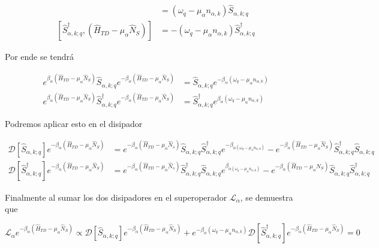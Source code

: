 \begin{appendixs}
\begin{align*}
    [\hat{S}_{\alpha,k;q},(\hat{H}_{TD} - \mu_{\alpha}\hat{N}_{S})] & = (\omega_{q} - \mu_{\alpha}n_{\alpha,k})\hat{S}_{\alpha,k;q}  \\
    [\hat{S}^{\dagger}_{\alpha,k;q},(\hat{H}_{TD} - \mu_{\alpha}\hat{N}_{S})] & = -(\omega_{q} - \mu_{\alpha}n_{\alpha,k})\hat{S}^{\dagger}_{\alpha,k;q}
\end{align*}

 Por ende se tendrá

 \begin{align*}
    e^{\beta_{\alpha}(\hat{H}_{TD} - \mu_{\alpha}\hat{N}_{S})}\hat{S}_{\alpha,k;q} e^{-\beta_{\alpha}(\hat{H}_{TD} - \mu_{\alpha}\hat{N}_{S})} & = \hat{S}_{\alpha,k;q}e^{-\beta_{\alpha}(\omega_{q} - \mu_{\alpha}n_{\alpha,k})} \\
    e^{\beta_{\alpha}(\hat{H}_{TD} - \mu_{\alpha}\hat{N}_{S})}\hat{S}^{\dagger}_{\alpha,k;q} e^{-\beta_{\alpha}(\hat{H}_{TD} - \mu_{\alpha}\hat{N}_{S})} & = \hat{S}^{\dagger}_{\alpha,k;q}e^{\beta_{\alpha}(\omega_{q} - \mu_{\alpha}n_{\alpha,k})}
 \end{align*}

Podremos aplicar esto en el disipador

\begin{align*}
    \mathcal{D}[\hat{S}_{\alpha,k;q}]e^{-\beta_{\alpha}(\hat{H}_{TD} - \mu_{\alpha}\hat{N}_{S})} & =  e^{-\beta_{\alpha}(\hat{H}_{TD} - \mu_{\alpha}\hat{N}_{s})} \hat{S}_{\alpha,k;q}\hat{S}^{\dagger}_{\alpha,k;q} e^{-\beta_{\alpha(\omega_{q} - \mu_{\alpha}n_{\alpha,k})}} - e^{-\beta_{\alpha}(\hat{H}_{TD} - \mu_{\alpha}\hat{N}_{S})} \hat{S}^{\dagger}_{\alpha,k;q}\hat{S}_{\alpha,k;q} \\
    \mathcal{D}[\hat{S}^{\dagger}_{\alpha,k;q}]e^{-\beta_{\alpha}(\hat{H}_{TD} - \mu_{\alpha}\hat{N}_{S})} & = e^{-\beta_{\alpha}(\hat{H}_{TD} - \mu_{\alpha}\hat{N}_{s})} \hat{S}^{\dagger}_{\alpha,k;q}\hat{S}_{\alpha,k;q} e^{\beta_{\alpha(\omega_{q} - \mu_{\alpha}n_{\alpha,k})}} - e^{-\beta_{\alpha}(\hat{H}_{TD} - \mu_{\alpha}\hat{N}_{S})} \hat{S}_{\alpha,k;q}\hat{S}^{\dagger}_{\alpha,k;q} 
\end{align*}

Finalmente al sumar los dos disipadores en el superoperador $\mathcal{L}_{\alpha}$, se demuestra que

\begin{equation*}
    \mathcal{L}_{\alpha}e^{-\beta_{\alpha}(\hat{H}_{TD} - \mu_{\alpha}\hat{N}_{S})} \propto  \mathcal{D}[\hat{S}_{\alpha,k;q}]e^{-\beta_{\alpha}(\hat{H}_{TD} - \mu_{\alpha}\hat{N}_{S})} + e^{-\beta_{\alpha}(\omega_{q} - \mu_{\alpha}n_{\alpha,k})}\mathcal{D}[\hat{S}^{\dagger}_{\alpha,k;q}]e^{-\beta_{\alpha}(\hat{H}_{TD} - \mu_{\alpha}\hat{N}_{S})} = 0
\end{equation*}


\end{appendixs}
